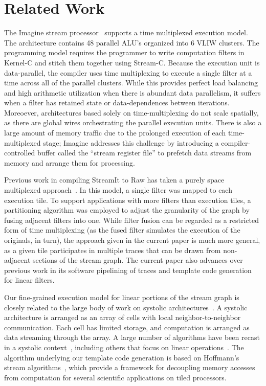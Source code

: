 \section{Related Work}
\label{sec:related}

The Imagine stream processor~\cite{rixner98bandwidthefficient}
supports a time multiplexed execution model.  The architecture
contains 48 parallel ALU's organized into 6 VLIW clusters.  The
programming model requires the programmer to write computation filters
in Kernel-C and stitch them together using Stream-C.  Because the
execution unit is data-parallel, the compiler uses time multiplexing
to execute a single filter at a time across all of the parallel
clusters.  While this provides perfect load balancing and high
arithmetic utilization when there is abundant data parallelism, it
suffers when a filter has retained state or data-dependences between
iterations.  Moreoever, architectures based solely on
time-multiplexing do not scale spatially, as there are global wires
orchestrating the parallel execution units.  There is also a large
amount of memory traffic due to the prolonged execution of each
time-multiplexed stage; Imagine addresses this challenge by
introducing a compiler-controlled buffer called the ``stream register
file'' to prefetch data streams from memory and arrange them for
processing.

Previous work in compiling StreamIt to Raw has taken a purely space
multiplexed approach~\cite{streamit-asplos}.  In this model, a single
filter was mapped to each execution tile.  To support applications
with more filters than execution tiles, a partitioning algorithm was
employed to adjust the granularity of the graph by fusing adjacent
filters into one.  While filter fusion can be regarded as a restricted
form of time multiplexing (as the fused filter simulates the execution
of the originals, in turn), the approach given in the current paper is
much more general, as a given tile participates in multiple traces
that can be drawn from non-adjacent sections of the stream graph.  The
current paper also advances over previous work in its software
pipelining of traces and template code generation for linear filters.

Our fine-grained execution model for linear portions of the stream
graph is closely related to the large body of work on systolic
architectures~\cite{systolic78,systolic82}.  A systolic architecture
is arranged as an array of cells with local neighbor-to-neighbor
communication.  Each cell has limited storage, and computation is
arranged as data streaming through the array.  A large number of
algorithms have been recast in a systolic
context~\cite{leighton-book}, including others that focus on linear
operations~\cite{wu87systolic}.  The algorithm underlying our template
code generation is based on Hoffmann's stream
algorithms~\cite{hoffmann-streams}, which provide a framework for
decoupling memory accesses from computation for several scientific
applications on tiled processors.

